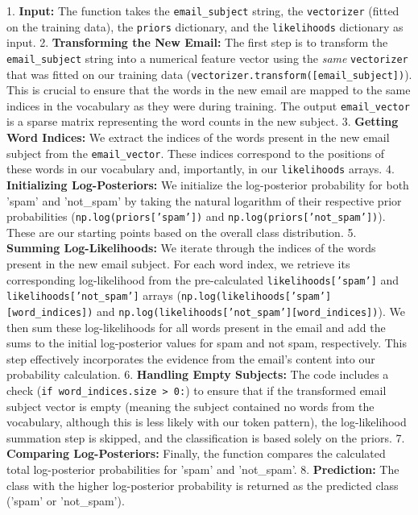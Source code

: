 \documentclass[12pt,a4paper]{article}
\begin{document}
1.  \textbf{Input:} The function takes the \texttt{email\_subject} string, the \texttt{vectorizer} (fitted on the training data), the \texttt{priors} dictionary, and the \texttt{likelihoods} dictionary as input.
2.  \textbf{Transforming the New Email:} The first step is to transform the \texttt{email\_subject} string into a numerical feature vector using the \textit{same} \texttt{vectorizer} that was fitted on our training data (\texttt{vectorizer.transform([email\_subject])}). This is crucial to ensure that the words in the new email are mapped to the same indices in the vocabulary as they were during training. The output \texttt{email\_vector} is a sparse matrix representing the word counts in the new subject.
3.  \textbf{Getting Word Indices:} We extract the indices of the words present in the new email subject from the \texttt{email\_vector}. These indices correspond to the positions of these words in our vocabulary and, importantly, in our \texttt{likelihoods} arrays.
4.  \textbf{Initializing Log-Posteriors:} We initialize the log-posterior probability for both 'spam' and 'not\_spam' by taking the natural logarithm of their respective prior probabilities (\texttt{np.log(priors['spam'])} and \texttt{np.log(priors['not\_spam'])}). These are our starting points based on the overall class distribution.
5.  \textbf{Summing Log-Likelihoods:} We iterate through the indices of the words present in the new email subject. For each word index, we retrieve its corresponding log-likelihood from the pre-calculated \texttt{likelihoods['spam']} and \texttt{likelihoods['not\_spam']} arrays (\texttt{np.log(likelihoods['spam'][word\_indices])} and \texttt{np.log(likelihoods['not\_spam'][word\_indices])}). We then sum these log-likelihoods for all words present in the email and add the sums to the initial log-posterior values for spam and not spam, respectively. This step effectively incorporates the evidence from the email's content into our probability calculation.
6.  \textbf{Handling Empty Subjects:} The code includes a check (\texttt{if word\_indices.size > 0:}) to ensure that if the transformed email subject vector is empty (meaning the subject contained no words from the vocabulary, although this is less likely with our token pattern), the log-likelihood summation step is skipped, and the classification is based solely on the priors.
7.  \textbf{Comparing Log-Posteriors:} Finally, the function compares the calculated total log-posterior probabilities for 'spam' and 'not\_spam'.
8.  \textbf{Prediction:} The class with the higher log-posterior probability is returned as the predicted class ('spam' or 'not\_spam').
\end{document}

